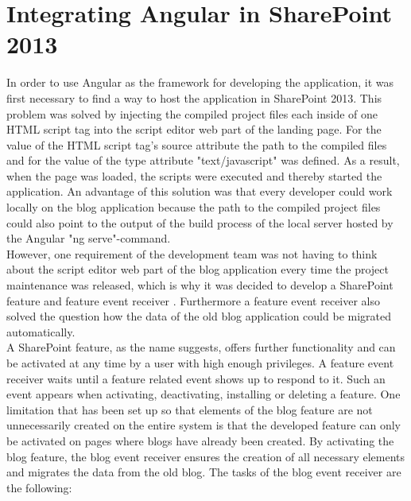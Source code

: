 \documentclass[Bachelor,BIF,english]{twbook}
\begin{document}
\section{Integrating Angular in SharePoint 2013}
In order to use Angular as the framework for developing the application, it was first necessary to find a way to host the application in SharePoint 2013. This problem was solved by injecting the compiled project files each inside of one HTML script tag into the script editor web part of the landing page. For the value of the  HTML script tag's source attribute the path to the compiled files and for the value of the type attribute "text/javascript" was defined. As a result, when the page was loaded, the scripts were executed and thereby started the application. An advantage of this solution was that every developer could work locally on the blog application because the path to the compiled project files could also point to the output of the build process of the local server hosted by the Angular "ng serve"-command.
\\[\baselineskip]
However, one requirement of the development team was not having to think about the script editor web part of the blog application every time the project maintenance was released, which is why it was decided to develop a SharePoint feature \cite{SPFeature} and feature event receiver \cite{SPFeatureEventReceiver}. Furthermore a feature event receiver also solved the question how the data of the old blog application could be migrated automatically.
\\[\baselineskip]
A SharePoint feature, as the name suggests, offers further functionality and can be activated at any time by a user with high enough privileges. A feature event receiver waits until a feature related event shows up to respond to it. Such an event appears when activating, deactivating, installing or deleting a feature. One limitation that has been set up so that elements of the blog feature are not unnecessarily created on the entire system is that the developed feature can only be activated on pages where blogs have already been created. By activating the blog feature, the blog event receiver ensures the creation of all necessary elements and migrates the data from the old blog. The tasks of the blog event receiver are the following:
\end{document}
